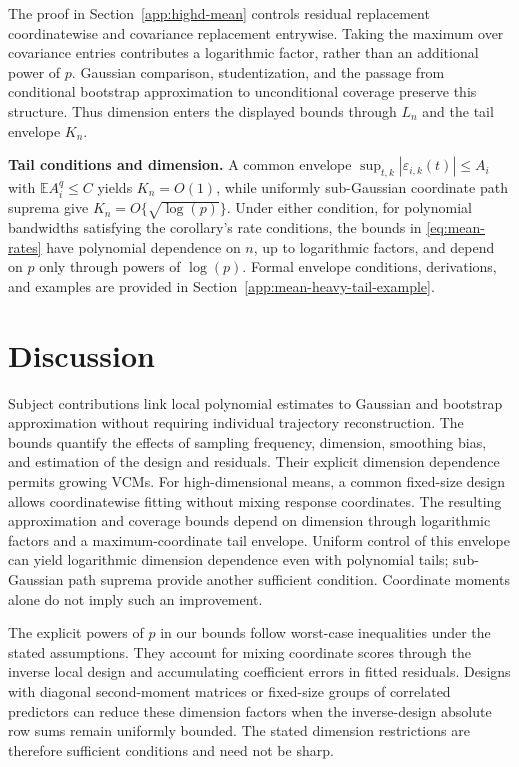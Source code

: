 \documentclass[12pt]{article}
\newcommand{\expect}{\mathbb{E}}
\numberwithin{equation}{section}
\begin{document}
The proof in Section~\ref{app:highd-mean} controls residual replacement
coordinatewise and covariance replacement entrywise. Taking the maximum
over covariance entries contributes a logarithmic factor, rather than
an additional power of $p$. Gaussian comparison, studentization, and
the passage from conditional bootstrap approximation to unconditional
coverage preserve this structure. Thus dimension enters the displayed
bounds through $L_n$ and the tail envelope $K_n$.

\noindent\textbf{Tail conditions and dimension.}
A common envelope $\sup_{t,k}|\varepsilon_{i,k}(t)|\le A_i$ with
$\expect A_i^q\le C$ yields $K_n=O(1)$, while uniformly sub-Gaussian
coordinate path suprema give $K_n=O\{\sqrt{\log(p)}\}$.
Under either condition, for polynomial bandwidths satisfying the
corollary's rate conditions, the bounds in \eqref{eq:mean-rates} have
polynomial dependence on $n$, up to logarithmic factors, and depend
on $p$ only through powers of $\log(p)$.
Formal envelope conditions, derivations, and examples are provided in
Section~\ref{app:mean-heavy-tail-example}.



\section{Discussion}\label{sec:discussion}

Subject contributions link local polynomial estimates to
Gaussian and bootstrap approximation without requiring
individual trajectory reconstruction. The bounds quantify the effects of
sampling frequency, dimension, smoothing bias, and estimation of the
design and residuals. Their explicit dimension dependence permits growing
VCMs. For high-dimensional means, a common fixed-size design allows
coordinatewise fitting without mixing response coordinates.
The resulting approximation and coverage bounds depend on dimension
through logarithmic factors and a maximum-coordinate tail envelope.
Uniform control of this envelope can yield logarithmic dimension
dependence even with polynomial tails; sub-Gaussian path suprema
provide another sufficient condition. Coordinate moments alone do
not imply such an improvement.

The explicit powers of $p$ in our bounds follow worst-case inequalities
under the stated assumptions. They account for mixing coordinate scores
through the inverse local design and accumulating coefficient errors in
fitted residuals. Designs with diagonal second-moment matrices or
fixed-size groups of correlated predictors can reduce these
dimension factors when the inverse-design absolute row sums remain
uniformly bounded. The stated dimension restrictions are therefore
sufficient conditions and need not be sharp.
\end{document}
